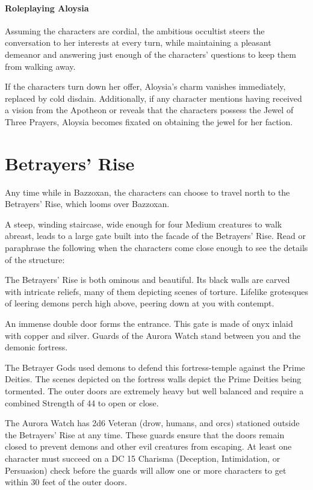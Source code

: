 \documentclass[10pt,a4paper,twoside,twocolumn,openany,nodeprecatedcode]{dndbook}
\begin{document}
\paragraph{Roleplaying Aloysia}
Assuming the characters are cordial, the ambitious occultist steers the conversation to her interests at every turn, while maintaining a pleasant demeanor and answering just enough of the characters' questions to keep them from walking away.

If the characters turn down her offer, Aloysia's charm vanishes immediately, replaced by cold disdain. Additionally, if any character mentions having received a vision from the Apotheon or reveals that the characters possess the Jewel of Three Prayers, Aloysia becomes fixated on obtaining the jewel for her faction.

\section{Betrayers' Rise}
Any time while in Bazzoxan, the characters can choose to travel north to the Betrayers' Rise, which looms over Bazzoxan.

A steep, winding staircase, wide enough for four Medium creatures to walk abreast, leads to a large gate built into the facade of the Betrayers' Rise. Read or paraphrase the following when the characters come close enough to see the details of the structure:

\begin{DndReadAloud}{}
The Betrayers' Rise is both ominous and beautiful. Its black walls are carved with intricate reliefs, many of them depicting scenes of torture. Lifelike grotesques of leering demons perch high above, peering down at you with contempt.

An immense double door forms the entrance. This gate is made of onyx inlaid with copper and silver. Guards of the Aurora Watch stand between you and the demonic fortress.

\end{DndReadAloud}

The Betrayer Gods used demons to defend this fortress-temple against the Prime Deities. The scenes depicted on the fortress walls depict the Prime Deities being tormented. The outer doors are extremely heavy but well balanced and require a combined Strength of 44 to open or close.

The Aurora Watch has 2d6 Veteran (drow, humans, and orcs) stationed outside the Betrayers' Rise at any time. These guards ensure that the doors remain closed to prevent demons and other evil creatures from escaping. At least one character must succeed on a DC 15 Charisma (Deception, Intimidation, or Persuasion) check before the guards will allow one or more characters to get within 30 feet of the outer doors.
\end{document}
